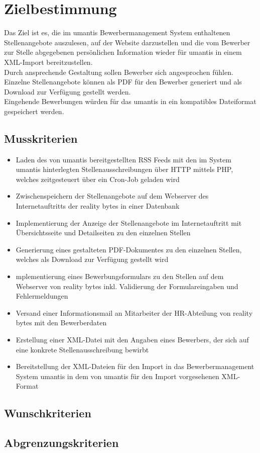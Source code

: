 \section{Zielbestimmung}

    Das Ziel ist es, die im \Gls{umantis} \Gls{Bewerbermanagement} System enthaltenen Stellenangebote auszulesen, auf der Website darzustellen und die vom Bewerber zur Stelle abgegebenen persönlichen Information wieder für umantis in einem XML-Import bereitzustellen. \\
    Durch ansprechende Gestaltung sollen Bewerber sich angesprochen fühlen. Einzelne Stellenangebote können als PDF für den Bewerber generiert und als \Gls{Download} zur Verfügung gestellt werden. \\
    Eingehende Bewerbungen würden für das umantis in ein kompatibles Dateiformat gespeichert werden.

    \subsection{Musskriterien}

        \begin{itemize}
            \item Laden des von umantis bereitgestellten RSS Feeds mit den im System umantis hinterlegten Stellenausschreibungen über HTTP mittels PHP, welches zeitgesteuert über ein Cron-Job geladen wird
            \item Zwischenspeichern der Stellenangebote auf dem Webserver des Internetauftritts der reality bytes in einer Datenbank
            \item Implementierung der Anzeige der Stellenangebote im Internetauftritt mit Übersichtsseite und Detailseiten zu den einzelnen Stellen
            \item Generierung eines gestalteten PDF-Dokumentes zu den einzelnen Stellen, welches als Download zur Verfügung gestellt wird
            \item mplementierung eines Bewerbungsformulars zu den Stellen auf dem Webserver von reality bytes inkl. Validierung der Formulareingaben und Fehlermeldungen
            \item Versand einer Informationsmail an Mitarbeiter der HR-Abteilung von reality bytes mit den Bewerberdaten
            \item Erstellung einer XML-Datei mit den Angaben eines Bewerbers, der sich auf eine konkrete Stellenausschreibung bewirbt
            \item Bereitstellung der XML-Dateien für den Import in das Bewerbermanagement System umantis in dem von umantis für den Import vorgesehenen XML-Format
        \end{itemize}

    \subsection{Wunschkriterien}



    \subsection{Abgrenzungskriterien}


